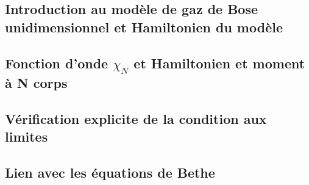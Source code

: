 \subsection{Introduction au modèle de gaz de Bose unidimensionnel et Hamiltonien du modèle}
%



%


%
 
\subsection{Fonction d’onde $\chi_N$ et Hamiltonien et moment à N corps}
%





%

%

\subsection{Vérification explicite de la condition aux limites}




\subsection{Lien avec les équations de Bethe}
